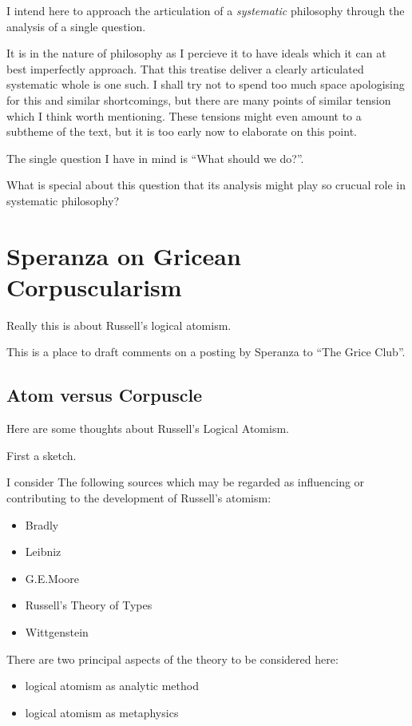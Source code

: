 \documentclass[10pt,titlepage]{article}
\begin{document}
I intend here to approach the articulation of a \emph{systematic} philosophy through the analysis of a single question.

It is in the nature of philosophy as I percieve it to have ideals which it can at best imperfectly approach.
That this treatise deliver a clearly articulated systematic whole is one such.
I shall try not to spend too much space apologising for this and similar shortcomings, but there are many points of similar tension which I think worth mentioning.
These tensions might even amount to a subtheme of the text, but it is too early now to elaborate on this point.

The single question I have in mind is ``What should we do?''.

What is special about this question that its analysis might play so crucual role in systematic philosophy?

\section{Speranza on Gricean Corpuscularism}

Really this is about Russell's logical atomism.

This is a place to draft comments on a posting by Speranza to ``The Grice Club''.


\subsection{Atom versus Corpuscle}

Here are some thoughts about Russell's Logical Atomism.

First a sketch.

I consider The following sources which may be regarded as influencing or contributing to the development of Russell's atomism:

\begin{itemize}
\item Bradly
\item Leibniz
\item G.E.Moore
\item Russell's Theory of Types
\item Wittgenstein
\end{itemize}

There are two principal aspects of the theory to be considered here:

\begin{itemize}
\item logical atomism as analytic method
\item logical atomism as metaphysics
\end{itemize}
\end{document}

